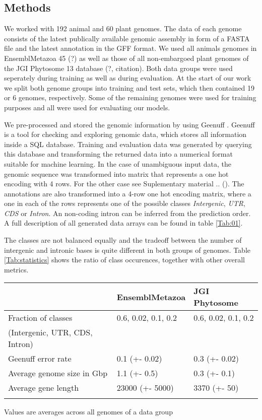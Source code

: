 \documentclass{bioinfo}
\begin{document}
\begin{methods}
\section{Methods}
We worked with 192 animal and 60 plant genomes. The data of each genome consists of the latest publically available genomic assembly in form of a FASTA file and the latest annotation in the GFF format. We used all animals genomes in EnsemblMetazoa 45 (?) \citealp{Howe19} as well as those of all non-embargoed plant genomes of the JGI Phytosome 13 database (?, citation). Both data groups were used seperately during training as well as during evaluation. At the start of our work we split both genome groups into training and test sets, which then contained 19 or 6 genomes, respectively. Some of the remaining genomes were used for training purposes and all were used for evaluating our models. 

We pre-processed and stored the genomic information by using Geenuff \citealp{Denton19}. Geenuff is a tool for checking and exploring genomic data, which stores all information inside a SQL database. Training and evaluation data was generated by querying this database and transforming the returned data into a numerical format suitable for machine learning. In the case of unambiguous input data, the genomic sequence was transformed into matrix that represents a one hot encoding with 4 rows. For the other case see Suplementary material .. (). The annotations are also transformed into a 4-row one hot encoding matrix, where a one in each of the rows represents one of the possible classes {\it Intergenic}, {\it UTR}, {\it CDS} or {\it Intron}. An non-coding intron can be inferred from the prediction order. A full description of all generated data arrays can be found in table \ref{Tab:01}.

The classes are not balanced equally and the tradeoff between the number of intergenic and intronic bases is quite different in both groups of genomes. Table \ref{Tab:statistics} shows the ratio of class occurences, together with other overall metrics.

\begin{table}[!t]
 {
\begin{tabular}{@{}lll@{}}
\toprule & EnsemblMetazoa & JGI Phytosome\\
\midrule
Fraction of classes  & 0.6, 0.02, 0.1, 0.2 & 0.6, 0.02, 0.1, 0.2 \\
(Intergenic, UTR, CDS, Intron) & & \\
Geenuff error rate & 0.1 (+- 0.02) & 0.3 (+- 0.02) \\
Average genome size in Gbp& 1.1 (+- 0.5) & 0.3 (+- 0.1) \\
Average gene length & 23000 (+- 5000) & 3370 (+- 50) \\
\botrule
\end{tabular}}{Values are averages across all genomes of a data group}
\end{table}


\end{methods}
\end{document}
